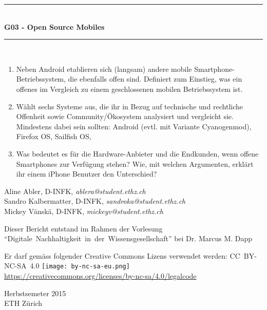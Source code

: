 \begin{titlepage}

\thispagestyle{plain}
\fancyhead{}
\fancyfoot{}

\begin{center}
\vspace{3.5cm}
\rule{\linewidth}{0.5mm} \\[0.4cm]
\textbf{\huge G03 - Open Source Mobiles} \\
\rule{\linewidth}{0.5mm} \\
\vspace{3\baselineskip}
\end{center}
\begin{large}
\begin{enumerate}
    \item Neben Android etablieren sich (langsam) andere mobile Smartphone-Betriebssystem, die ebenfalls offen sind. Definiert zum Einstieg, was ein offenes im Vergleich zu einem geschlossenen mobilen Betriebssystem ist.

    \item Wählt sechs Systeme aus, die ihr in Bezug auf technische und rechtliche Offenheit sowie Community/Ökosystem analysiert und vergleicht sie. Mindestens dabei sein sollten: Android (evtl. mit Variante Cyanogenmod), Firefox OS, Sailfish OS, \textellipsis

    \item Was bedeutet es für die Hardware-Anbieter und die Endkunden, wenn offene Smartphones zur Verfügung stehen? Wie, mit welchen Argumenten, erklärt ihr einem iPhone Benutzer den Unterschied?
\end{enumerate}

\begin{center}
\vfill

 Aline Abler, \textsc{D-INFK}, \emph{ablera@student.ethz.ch} \\
Sandro Kalbermatter, \textsc{D-INFK}, \emph{sandroka@student.ethz.ch} \\
Mickey Vänskä, \textsc{D-INFK}, \emph{mickeyv@student.ethz.ch} \\
\vspace{2\baselineskip}

Dieser Bericht entstand im Rahmen der Vorlesung \mbox{``Digitale Nachhaltigkeit in der Wissensgesellschaft''} bei Dr{.} Marcus M{.} Dapp \\
\vspace{2\baselineskip}

Er darf gemäss folgender Creative Commons Lizens verwendet werden: \mbox{CC BY-NC-SA 4.0} \texttt{[image: by-nc-sa-eu.png]}\\ \url{https://creativecommons.org/licenses/by-nc-sa/4.0/legalcode} \\
\vfill

Herbstsemeter 2015 \\
\vspace{0.5\baselineskip}
ETH Zürich

\end{center}
\end{large}

\end{titlepage}
